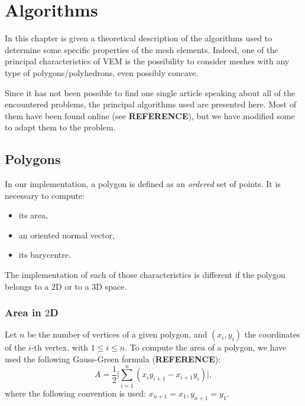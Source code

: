 \newpage
\section{Algorithms}
In this chapter is given a theoretical description of the algorithms used to determine some specific properties of the mesh elements. Indeed, one of the principal characteristics of VEM is the possibility to consider meshes with any type of polygons/polyhedrons, even possibly concave. 

Since it has not been possible to find one single article speaking about all of the encountered problems, the principal algorithms used are presented here. Most of them have been found online (see \textbf{REFERENCE}), but we have modified some to adapt them to the problem.

\subsection{Polygons}
In our implementation, a polygon is defined as an \textit{ordered} set of points. It is necessary to compute:
\begin{itemize}
\item its area,
\item an oriented normal vector,
\item its barycentre.
\end{itemize}
The implementation of each of those characteristics is different if the polygon belongs to a $2$D or to a $3$D space.

\subsubsection{Area in $2$D}\label{area2d}
Let $n$ be the number of vertices of a given polygon, and $(x_i,y_i)$ the coordinates of the $i$-th vertex, with $1\leq i\leq n$. To compute the area of a polygon, we have used the following Gauss-Green formula (\textbf{REFERENCE}):
$$ A=\frac{1}{2} \bigg | \sum_{i=1}^n (x_iy_{i+1}-x_{i+1}y_i) \bigg
|,$$
where the following convention is used: $x_{n+1}=x_1,y_{n+1}=y_1$.

